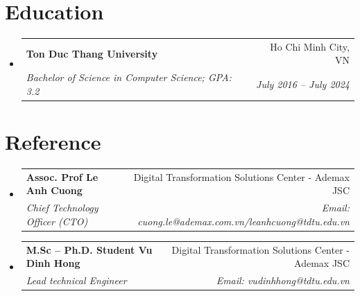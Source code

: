 \documentclass[letterpaper,11pt]{article}
\makeatletter
\newcommand{\resumeSubheading}[4]{
  \vspace{-1pt}\item
    \begin{tabular*}{0.97\textwidth}[t]{l@{\extracolsep{\fill}}r}
      \textbf{#1} & #2 \\
      \textit{\small#3} & \textit{\small #4} \\
    \end{tabular*}\vspace{-5pt}
}
\newcommand{\resumeSubHeadingListStart}{\begin{itemize}[leftmargin=*]}
\newcommand{\resumeSubHeadingListEnd}{\end{itemize}}
\makeatother
\begin{document}
\section{Education}
  \resumeSubHeadingListStart
    \resumeSubheading
      {Ton Duc Thang University}{Ho Chi Minh City, VN}
      {Bachelor of Science in Computer Science; GPA: 3.2}{July 2016 -- July 2024}
  \resumeSubHeadingListEnd
\section{Reference}
  \resumeSubHeadingListStart
    \resumeSubheading
      {Assoc. Prof Le Anh Cuong}{Digital Transformation Solutions Center - Ademax JSC}
      {Chief Technology Officer (CTO)}{Email: cuong.le@ademax.com.vn/leanhcuong@tdtu.edu.vn}

    \resumeSubheading
  {M.Sc – Ph.D. Student Vu Dinh Hong}{Digital Transformation Solutions Center - Ademax JSC}
  {Lead technical Engineer}{Email: vudinhhong@tdtu.edu.vn}
  \resumeSubHeadingListEnd
\end{document}
